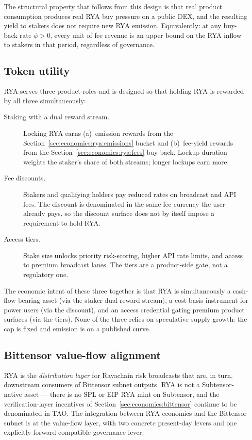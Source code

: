 \documentclass[11pt,a4paper]{article}
\begin{document}
The structural property that follows from this design is that real product
consumption produces real RYA buy pressure on a public DEX, and the resulting yield
to stakers does not require new RYA emission. Equivalently: at any buy-back rate
$\phi > 0$, every unit of fee revenue is an upper bound on the RYA inflow to
stakers in that period, regardless of governance.

\subsection{Token utility}\label{sec:economics:rya:utility}

RYA serves three product roles and is designed so that holding RYA is rewarded by
all three simultaneously:
\begin{description}
  \item[Staking with a dual reward stream.] Locking RYA earns (a)~emission rewards
        from the Section~\ref{sec:economics:rya:emissions} bucket and (b)~fee-yield
        rewards from the Section~\ref{sec:economics:rya:fees} buy-back. Lockup
        duration weights the staker's share of both streams; longer lockups earn
        more.
  \item[Fee discounts.] Stakers and qualifying holders pay reduced rates on
        broadcast and API fees. The discount is denominated in the same fee
        currency the user already pays, so the discount surface does not by itself
        impose a requirement to hold RYA.
  \item[Access tiers.] Stake size unlocks priority risk-scoring, higher API rate
        limits, and access to premium broadcast lanes. The tiers are a
        product-side gate, not a regulatory one.
\end{description}
The economic intent of these three together is that RYA is simultaneously a
cash-flow-bearing asset (via the staker dual-reward stream), a cost-basis
instrument for power users (via the discount), and an access credential gating
premium product surfaces (via the tiers). None of the three relies on speculative
supply growth: the cap is fixed and emission is on a published curve.

\subsection{Bittensor value-flow alignment}\label{sec:economics:rya:bittensor}

RYA is the \emph{distribution layer} for Rayachain risk broadcasts that are, in
turn, downstream consumers of Bittensor subnet outputs. RYA is not a
Subtensor-native asset --- there is no SPL or EIP RYA mint on Subtensor, and the
verification-layer incentives of Section~\ref{sec:economics:bittensor} continue to
be denominated in TAO. The integration between RYA economics and the Bittensor
subnet is at the value-flow layer, with two concrete present-day levers and one
explicitly forward-compatible governance lever.
\end{document}
